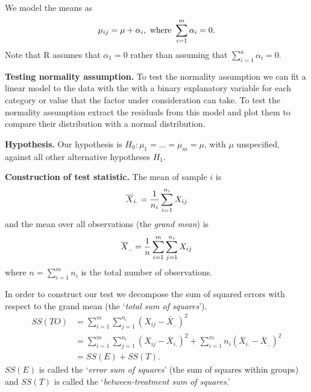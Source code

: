 \documentclass[10pt, two column]{article}
\begin{document}
We model the means as \vspace{-5pt}
\[
\mu_{ij} = \mu + \alpha_{i}, \text{ where } \sum_{i=1}^{m} \alpha_{i} = 0. \vspace{-5pt}
\]
Note that R assumes that $\alpha_{1} = 0$ rather than assuming that $\sum_{i=1}^{a} \alpha_{i} = 0$.

{\bf Testing normality assumption.} To test the normality assumption we can fit a linear model to the data with the with a binary explanatory variable for each category or value that the factor under consideration can take. To test the normality assumption extract the residuals from this model and plot them to compare their distribution with a normal distribution.  

{\bf Hypothesis.} Our hypothesis is $H_{0}: \mu_{1} = \dots = \mu_{m} = \mu$, with $\mu$ unspecified, against all other alternative hypotheses $H_{1}$. 

{\bf Construction of test statistic.} The mean of sample $i$ is \vspace{-5pt}
\[
\overline{X}_{i.} = \frac{1}{n_{i}} \sum_{i=1}^{n_{i}} X_{ij} \vspace{-5pt}
\]
and the mean over all observations (the \emph{grand mean}) is \vspace{-5pt} 
\[
\overline{X}_{..} = \frac{1}{n} \sum_{i=1}^{m}\sum_{j=1}^{n_{i}} X_{ij} \vspace{-5pt} 
\]
where $n = \sum_{i=1}^{m} n_{i}$ is the total number of observations. 

In order to construct our test we decompose the sum of squared errors with respect to the grand mean (the `\emph{total sum of squares}'). \vspace{-5pt}
\begin{align*} 
SS(TO) &= \sum_{i=1}^{m} \sum_{j=1}^{n_{i}} (X_{ij} - \overline{X}_{..})^{2} \\
&= \sum_{i=1}^{m} \sum_{j=1}^{n_{i}} (X_{ij} - \overline{X}_{i.})^{2} + \sum_{i=1}^{m} n_{i}(\overline{X}_{i.} - \overline{X}_{..})^{2} \\
&= SS(E) + SS(T).    
\end{align*} 
$SS(E)$ is called the `\emph{error sum of squares}' (the sum of squares within groups) and $SS(T)$ is called the `\emph{between-treatment sum of squares}.'
\end{document}
